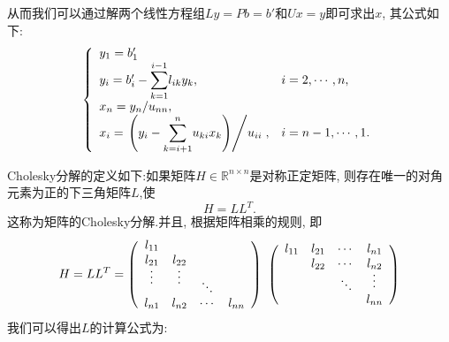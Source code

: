 \documentclass[a4paper]{article}
\begin{document}
\begin{CJK*}{GBK}{song}
从而我们可以通过解两个线性方程组$Ly=Pb=b'$和$Ux=y$即可求出$x$, 其公式如下:
\begin{equation}\label{lu}
    \left\{
    \begin{array}{ll}
    y_1 = b'_1 & \\
    y_i=b'_i-\displaystyle{\sum_{k=1}^{i-1}}l_{ik}y_k, & i=2,\cdots,n,\\
    x_n = y_n / u_{nn}, & \\
    x_i=\left. \left(y_i-\displaystyle{\sum_{k=i+1}^{n}}u_{ki}x_k\right)\middle/ u_{ii}\right., & i=n-1,\cdots ,1. \\
    \end{array} \right.
\end{equation}\par
Cholesky分解的定义如下:如果矩阵$H \in \mathbb{R}^{n \times n}$是对称正定矩阵, 则存在唯一的对角元素为正的下三角矩阵$L$,使 $$H=LL^T.$$
这称为矩阵的Cholesky分解.并且, 根据矩阵相乘的规则, 即 \\
$$ H=LL^T= \left(                 %
        \begin{array}{cccc}   %
            l_{11} & \  & \  & \   \\  %
            l_{21} & l_{22} & \ & \ \\  %
            \rotatebox{90}{$\cdots$} & \rotatebox{90}{$\cdots$}  & \rotatebox{-45}{$\cdots$} & \ \\
            l_{n1} & l_{n2} & \cdots & l_{nn} \\
        \end{array}
        \right)                 %
        \
        \left(                 %
        \begin{array}{cccc}   %
            l_{11} & l_{21}  & \cdots  & l_{n1}   \\  %
            \  & l_{22} & \cdots & l_{n2} \\  %
            \ & \  & \rotatebox{135}{$\cdots$} & \rotatebox{90}{$\cdots$}  \\
            \ & \ & \ & l_{nn} \\
        \end{array}
        \right) $$
我们可以得出$L$的计算公式为:\par


\end{CJK*}
\end{document}

